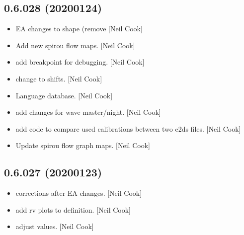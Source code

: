 \documentclass[a4paper,10pt,english]{report}
\begin{document}
\subsection{0.6.028 (2020\sphinxhyphen{}01\sphinxhyphen{}24)}
\label{\detokenize{misc/changelog:id9}}\begin{itemize}
\item {} 
 \sphinxhyphen{} EA changes to shape (remove 
{[}Neil Cook{]}

\item {} 
Add new spirou flow maps. {[}Neil Cook{]}

\item {} 
 \sphinxhyphen{} add breakpoint for
debugging. {[}Neil Cook{]}

\item {} 
 \sphinxhyphen{} change  to shifts.
{[}Neil Cook{]}

\item {} 
Language database. {[}Neil Cook{]}

\item {} 
 \sphinxhyphen{} add changes for wave
master/night. {[}Neil Cook{]}

\item {} 
 \sphinxhyphen{} add code to compare used calibrations
between two e2ds files. {[}Neil Cook{]}

\item {} 
Update spirou flow graph maps. {[}Neil Cook{]}

\end{itemize}


\subsection{0.6.027 (2020\sphinxhyphen{}01\sphinxhyphen{}23)}
\label{\detokenize{misc/changelog:id10}}\begin{itemize}
\item {} 
 \sphinxhyphen{} corrections after EA changes. {[}Neil Cook{]}

\item {} 
 \sphinxhyphen{} add rv plots to
 definition. {[}Neil Cook{]}

\item {} 
 \sphinxhyphen{} adjust 
values. {[}Neil Cook{]}

\end{itemize}
\end{document}
